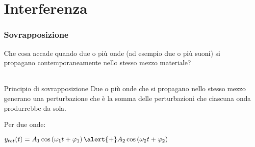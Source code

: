 \documentclass[]{beamer}
\theoremstyle{plain}
\begin{document}
\section{Interferenza}

\begin{frame}
  \frametitle{Sovrapposizione}
  Che cosa accade quando due o più onde (ad esempio due o più suoni) si propagano contemporaneamente nello stesso mezzo materiale?\\~\pause
  \begin{block}{Principio di sovrapposizione}
    Due o più onde che si propagano nello stesso mezzo generano una perturbazione che è la \alert{somma} delle perturbazioni che ciascuna onda produrrebbe da sola.\pause
    
    Per due onde:
    \begin{center}
    \colorbox{blue!30}{$ y_{tot}(t) = A_1 \cos \left( \omega_1 t + \varphi_1 \right) \alert{+} A_2 \cos \left( \omega_2 t + \varphi_2 \right) $}
    \end{center}
  \end{block}
\end{frame}
\end{document}
